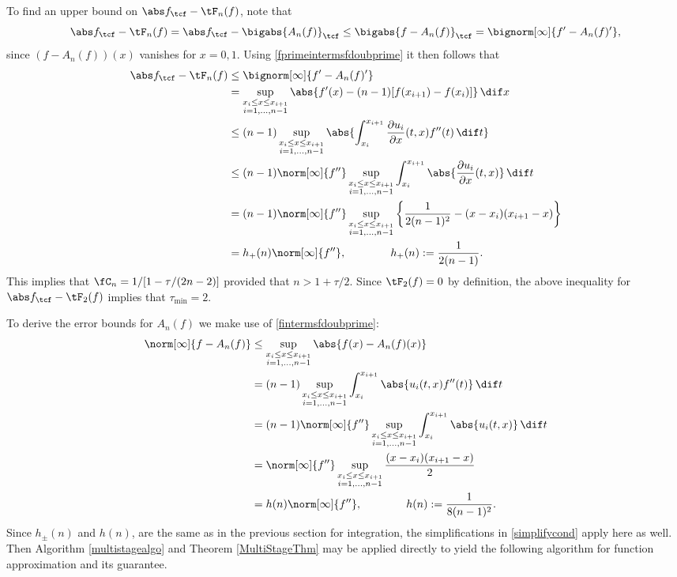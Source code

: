 To find an upper bound on $\Ftnorm{f}-\tF_{n}(f)$, note that
\begin{equation*}
\Ftnorm{f} - \tF_{n}(f) = \Ftnorm{f} - \bigabs{A_n(f)}_{\tcf} \le \bigabs{f-A_n(f)}_{\tcf} = \bignorm[\infty]{f' -A_n(f)'},
\end{equation*}
since $(f-A_n(f))(x)$ vanishes for $x=0,1$. Using \eqref{fprimeintermsfdoubprime} it then follows that
\begin{align*}
\Ftnorm{f} - \tF_{n}(f) & \le \bignorm[\infty]{f' -A_n(f)'} \\
& = \sup_{\substack{x_i \le x \le x_{i+1}\\ i=1, \ldots, n-1 }} \abs{f'(x) -(n-1)[f(x_{i+1})-f(x_i)]} \, \dif x \\
&\le(n-1) \sup_{\substack{x_i \le x \le x_{i+1}\\ i=1, \ldots, n-1 }} \abs{ \int_{x_i}^{x_{i+1}} \frac{\partial u_i}{\partial x}(t,x) f''(t) \, \dif t} \\
& \le (n-1) \norm[\infty]{f''} \sup_{\substack{x_i \le x \le x_{i+1}\\ i=1, \ldots, n-1 }} \int_{x_i}^{x_{i+1}} \abs{\frac{\partial u_i}{\partial x}(t,x)} \, \dif t \\
&=(n-1)\norm[\infty]{f''} \sup_{\substack{x_i \le x \le x_{i+1}\\ i=1, \ldots, n-1 }} \left \{\frac{1}{2(n-1)^2} - (x-x_i)(x_{i+1}-x) \right\} \\
&= h_+(n) \norm[\infty]{f''}, \qquad \qquad  h_+(n):= \frac{1}{2(n-1)}.
\end{align*}
This implies that $\fC_n =1/[1 - \tau /(2n-2)]$ provided that $n>1+\tau/2$.
Since $\tF_2(f)=0$ by definition, the above inequality for $\Ftnorm{f} - \tF_{2}(f)$ implies that $\tau_{\min}=2$.

To derive the error bounds for $A_n(f)$ we make use of \eqref{fintermsfdoubprime}:
\begin{align*}
\norm[\infty]{f-A_n(f)}
& \le \sup_{\substack{x_i \le x \le x_{i+1}\\ i=1, \ldots, n-1 }} \abs{f(x)-A_n (f)(x)}\\
&= (n-1)\sup_{\substack{x_i \le x \le x_{i+1}\\ i=1, \ldots, n-1 }}  \int_{x_i}^{x_{i+1}} \abs{u_i(t,x) f''(t)} \, \dif t\\
&= (n-1)\norm[\infty]{f''} \sup_{\substack{x_i \le x \le x_{i+1}\\ i=1, \ldots, n-1 }}  \int_{x_i}^{x_{i+1}} \abs{u_i(t,x)} \, \dif t\\
&=\norm[\infty]{f''} \sup_{\substack{x_i \le x \le x_{i+1}\\ i=1, \ldots, n-1 }}  \frac{(x-x_i)(x_{i+1}-x)}2 \\
&= h(n) \norm[\infty]{f''}, \qquad \qquad  h(n):= \frac{1}{8(n-1)^2}.
\end{align*}
Since $h_{\pm}(n)$ and $h(n)$, are the same as in the previous section for integration, the simplifications in \eqref{simplifycond} apply here as well.  Then Algorithm \ref{multistagealgo} and Theorem \ref{MultiStageThm} may be applied directly to  yield the following algorithm for function approximation and its guarantee.

